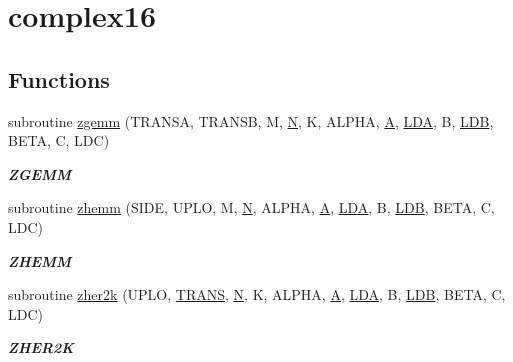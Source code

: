 \hypertarget{group__complex16__blas__level3}{}\section{complex16}
\label{group__complex16__blas__level3}
\subsection*{Functions}
\begin{DoxyCompactItemize}
\item 
subroutine \hyperlink{group__complex16__blas__level3_ga4ef748ade85e685b8b2241a7c56dd21c}{zgemm} (T\+R\+A\+N\+S\+A, T\+R\+A\+N\+S\+B, M, \hyperlink{polmisc_8c_a0240ac851181b84ac374872dc5434ee4}{N}, K, A\+L\+P\+H\+A, \hyperlink{classA}{A}, \hyperlink{example__user_8c_ae946da542ce0db94dced19b2ecefd1aa}{L\+D\+A}, B, \hyperlink{example__user_8c_a50e90a7104df172b5a89a06c47fcca04}{L\+D\+B}, B\+E\+T\+A, C, L\+D\+C)
\begin{DoxyCompactList}\small\item\em {\bfseries Z\+G\+E\+M\+M} \end{DoxyCompactList}\item 
subroutine \hyperlink{group__complex16__blas__level3_ga6c1fde6c797cc1032c19242662f370f2}{zhemm} (S\+I\+D\+E, U\+P\+L\+O, M, \hyperlink{polmisc_8c_a0240ac851181b84ac374872dc5434ee4}{N}, A\+L\+P\+H\+A, \hyperlink{classA}{A}, \hyperlink{example__user_8c_ae946da542ce0db94dced19b2ecefd1aa}{L\+D\+A}, B, \hyperlink{example__user_8c_a50e90a7104df172b5a89a06c47fcca04}{L\+D\+B}, B\+E\+T\+A, C, L\+D\+C)
\begin{DoxyCompactList}\small\item\em {\bfseries Z\+H\+E\+M\+M} \end{DoxyCompactList}\item 
subroutine \hyperlink{group__complex16__blas__level3_ga7610d30107c40b4009d5c9359d9c6c28}{zher2k} (U\+P\+L\+O, \hyperlink{superlu__enum__consts_8h_a0c4e17b2d5cea33f9991ccc6a6678d62a1f61e3015bfe0f0c2c3fda4c5a0cdf58}{T\+R\+A\+N\+S}, \hyperlink{polmisc_8c_a0240ac851181b84ac374872dc5434ee4}{N}, K, A\+L\+P\+H\+A, \hyperlink{classA}{A}, \hyperlink{example__user_8c_ae946da542ce0db94dced19b2ecefd1aa}{L\+D\+A}, B, \hyperlink{example__user_8c_a50e90a7104df172b5a89a06c47fcca04}{L\+D\+B}, B\+E\+T\+A, C, L\+D\+C)
\begin{DoxyCompactList}\small\item\em {\bfseries Z\+H\+E\+R2\+K} \end{DoxyCompactList}\item 

\end{DoxyCompactItemize}
